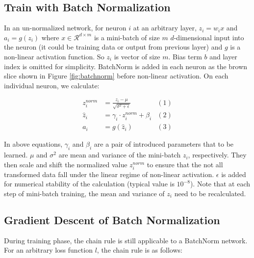 \documentclass{article}
\begin{document}
\subsection{Train with Batch Normalization}
In an un-normalized network, for neuron $i$ at an arbitrary layer, $z_i=w_ix$ and $a_i=g(z_i)$ where $x\in\mathcal{R}^{d\times m}$ is a mini-batch of size $m$ $d$-dimensional input into the neuron (it could be training data or output from previous layer) and $g$ is a non-linear activation function. So $z_i$ is vector of size $m$. Bias term $b$ and layer index is omitted for simplicity. BatchNorm is added in each neuron as the brown slice shown in Figure \ref{fig:batchnorm} before non-linear activation. On each individual neuron, we calculate:

\begin{align*}
    z_i^{norm}& = \frac{z_i-\mu}{\sqrt{\sigma^2+\epsilon}}  &(1)\\
    \hat{z}_i&= \gamma_i\cdot z_i^{norm}+\beta_i  &(2)\\
    a_i&=g(\hat{z}_i) &(3)
\end{align*}

In above equations, $\gamma_i$ and $\beta_i$ are a pair of introduced parameters that to be learned. $\mu$ and $\sigma^2$ are mean and variance of the mini-batch $z_i$, respectively. They then scale and shift the normalized value $z_i^{norm}$ to ensure that the not all transformed data fall under the linear regime of non-linear activation. $\epsilon$ is added for numerical stability of the calculation (typical value is $10^{-8}$). Note that at each step of mini-batch training, the mean and variance of $z_i$ need to be recalculated.

\subsection{Gradient Descent of Batch Normalization}

During training phase, the chain rule is still applicable to a BatchNorm network. For an arbitrary loss function $l$, the chain rule is as follows:
\end{document}

